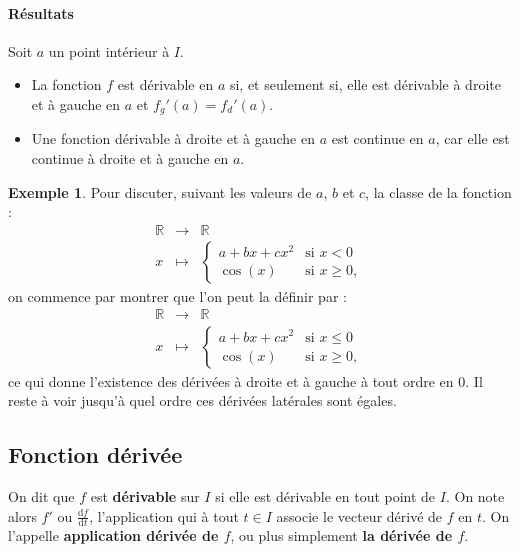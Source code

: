 \documentclass[french]{article}
\newcommand{\R}{\mathbb{R}}
\renewcommand{\d}{\text{d}}
\theoremstyle{plain}
\theoremstyle{definition}
\newtheorem*{ex}{Exemple}
\theoremstyle{remark}
\begin{document}
\paragraph{Résultats} Soit $a$ un point intérieur à $I$.
\begin{itemize}
	\item La fonction $f$ est dérivable en $a$ si, et seulement si, elle est dérivable à droite et à gauche en $a$ et $f_g'(a)=f_d'(a)$.
	\item Une fonction dérivable à droite et à gauche en $a$ est continue en $a$, car elle est continue à droite et à gauche en $a$.
\end{itemize}

\begin{ex}
	Pour discuter, suivant les valeurs de $a$, $b$ et $c$, la classe de la fonction :
	$$\begin{array}{rcl}
		\R&\longrightarrow&\R\\
		x&\longmapsto&\displaystyle\begin{cases}
			a+bx+cx^2&\text{si }x<0\\
			\cos(x)&\text{si }x\geqslant0,
		\end{cases}
	\end{array}$$ on commence par montrer que l'on peut la définir par :
	$$\begin{array}{rcl}
		\R&\longrightarrow&\R\\
		x&\longmapsto&\displaystyle\begin{cases}
			a+bx+cx^2&\text{si }x\leqslant0\\
			\cos(x)&\text{si }x\geqslant0,
		\end{cases}
	\end{array}$$ ce qui donne l'existence des dérivées à droite et à gauche à tout ordre en $0$. Il reste à voir jusqu'à quel ordre ces dérivées latérales sont égales.
\end{ex}

\subsection{Fonction dérivée}

\begin{dfn}
	On dit que $f$ est \textbf{dérivable} sur $I$ si elle est dérivable en tout point de $I$. On note alors $f'$ ou $\displaystyle\frac{\d f}{\d t}$, l'application qui à tout $t\in I$ associe le vecteur dérivé de $f$ en $t$. On l'appelle \textbf{application dérivée de $f$}, ou plus simplement \textbf{la dérivée de $f$}.
\end{dfn}
\end{document}
